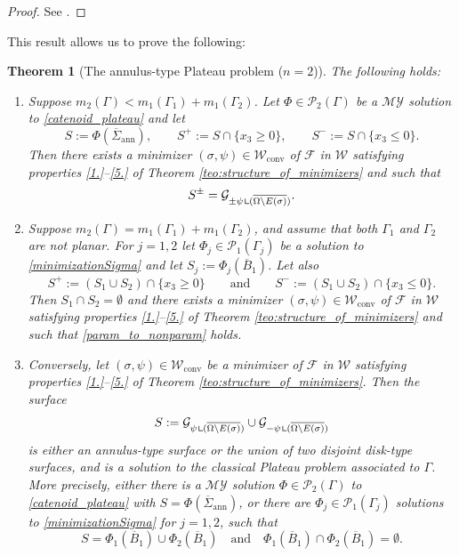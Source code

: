 \documentclass[11pt]{article}
\numberwithin{equation}{section}
\let\Om\Omega
\newcommand\admclassconv{{\mathcal W_\mathrm{conv}}}
\newcommand{\immclosedann}{\Phi({\overline\Sigma}_\mathrm{ann})}
\newcommand{\resa}{\mathop{\hbox{\vrule height 7pt width 0.5pt depth 0pt
\vrule height 0.5pt width 6pt depth 0pt}}\nolimits}
\newcommand{\resb}{\mathop{\hbox{\vrule height 4pt width 0.5pt depth 0pt
\vrule height 0.5pt width 3pt depth 0pt}}\nolimits}
\newcommand{\res}{\mathchoice{\resa}{\resa}{\resb}{\resb}}
\newtheorem{theorem}{Theorem}[section]
\theoremstyle{definition}
\begin{document}
\begin{proof}
See \cite{MY}.
\end{proof}
This result allows us to prove the following:
\begin{theorem}[The annulus-type Plateau problem ($n=2$)]
\label{teo:the_annulus_type_Plateau_problem_n=2}
The following holds:
\begin{enumerate}[{\rm(i)},wide]
\item \label{1plateau} Suppose $m_2(\Gamma)<m_1(\Gamma_1)+m_1(\Gamma_2)$.
Let $\Phi\in\mathcal{P}_2(\Gamma)$
be a $\mathcal{MY}$ solution to \eqref{catenoid_plateau} and let
\begin{equation*}
S:=\immclosedann, \qquad
S^+:=S\cap\{x_3\ge0\},\qquad
S^-:=S\cap\{x_3\le0\}.
\end{equation*}
Then there exists a minimizer $(\sigma,\psi)\in \admclassconv$
of $\mathcal F$ in $\mathcal W$ satisfying properties \ref{1.}--\ref{5.} of Theorem \ref{teo:structure_of_minimizers} and such that
\begin{equation}\label{param_to_nonparam}
S^{\pm}=\mathcal G_{\pm\psi\res (\overline{\Om\setminus E(\sigma)})}.
\end{equation}
\item\label{2plateau} Suppose $m_2(\Gamma)= m_1(\Gamma_1)+m_1(\Gamma_2)$, { and assume that both $\Gamma_1$ and $\Gamma_2$ are not planar}. For $j=1,2$ let $\Phi_j\in\mathcal{P}_1(\Gamma_j)$ be a solution to \eqref{minimizationSigma} and let $S_j:=\Phi_j(\overline B_1)$. Let also
\begin{equation*}
S^+:=(S_1\cup S_2)\cap\{x_3\ge0\}\qquad\text{and}\qquad
S^-:=(S_1\cup S_2)\cap\{x_3\le0\}.
\end{equation*}
Then $S_1\cap S_2=\emptyset$ and there exists a minimizer $(\sigma,\psi)\in \admclassconv$ of $\mathcal F$ in $\mathcal W$ satisfying properties \ref{1.}--\ref{5.} of Theorem \ref{teo:structure_of_minimizers} and such that \eqref{param_to_nonparam} holds.
\item \label{3plateau}
Conversely, let $(\sigma,\psi)\in \admclassconv$ be a minimizer of $\mathcal F$ in $\mathcal W$ satisfying properties \ref{1.}--\ref{5.} of Theorem \ref{teo:structure_of_minimizers}. Then the surface
\[
S:=\mathcal G_{\psi\res (\overline{\Om\setminus E(\sigma)})}\cup\mathcal G_{-\psi\res (\overline{\Om\setminus E(\sigma)})}
\]
is either an annulus-type surface or the union of two disjoint disk-type surfaces, and is a solution to the classical Plateau problem associated to $\Gamma$. More precisely, either there is a $\mathcal{MY}$ solution $\Phi\in\mathcal{P}_2(\Gamma)$ to \eqref{catenoid_plateau} with
$S=\immclosedann$, or there are $\Phi_j\in\mathcal{P}_1(\Gamma_j)$ solutions to \eqref{minimizationSigma} for $j=1,2$, such that
\[
S=\Phi_1(\overline B_1)\cup \Phi_2(\overline B_1)\quad\text{and}\quad\Phi_1(\overline B_1)\cap \Phi_2(\overline B_1)=\emptyset.
\]
\end{enumerate}
\end{theorem}
\end{document}
